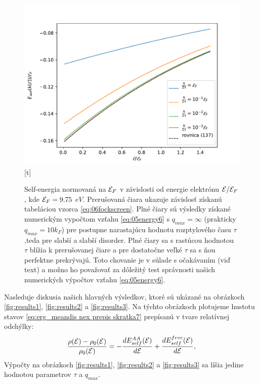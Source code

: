 \begin{figure}
\centering
\includegraphics[scale=1]{grafy/plot_se_test}[t]
\caption{Self-energia normovaná na $\mathcal{E}_F$ v závislosti od energie elektrónu $\mathcal{E}/\mathcal{E}_F$, kde $\mathcal{E}_F=9.75$ $eV$. Prerušovaná čiara ukazuje závislosť získanú tabeláciou vzorca \eqref{eq:06fockscreen}. 
Plné čiary sú výsledky získané numerickým vypočtom vzťahu \eqref{eq:05energy6} s  $q_{max} = \infty$ (prakticky $q_{max} = 10 k_F$)  pre postupne narastajúcu
hodnotu rozptylového času $\tau$,teda pre slabší a slabší disorder. Plné čiary sa s rastúcou hodnotou $\tau$ blížia k prerušovanej čiare a pre dostatočne veľké $\tau$ sa s ňou perfektne prekrývajú. Toto 
chovanie je v súlade s očakávaním (viď text) a možno ho považovať za dôležitý test správnosti našich numerických výpočtov vzťahu \eqref{eq:05energy6}.}
\label{fig:plot_test}
\end{figure}

Nasleduje diskusia našich hlavných výsledkov, ktoré sú ukázané na obrázkoch \ref{fig:results1}, \ref{fig:results2} a \ref{fig:results3}.
Na týchto obrázkoch plotujeme hustotu stavov \eqref{eq:erg_meandis nex prepis skratka7} prepísanú v tvare relatívnej odchýlky:
\begin{equation}\label{eq:erg_hustota stavov relat}
\frac{\rho(\mathcal{E}) - \rho_0(\mathcal{E})}{\rho_0(\mathcal{E})} = - \frac{dE_{self}^{AA}(\mathcal{E})}{d\mathcal{E}} + \frac{dE_{self}^{free}(\mathcal{E})}{d\mathcal{E}} \text{,}
\end{equation}
Výpočty na obrázkoch \ref{fig:results1}, \ref{fig:results2} a \ref{fig:results3} sa líšia jedine hodnotou parametrov $\tau$ a $q_{max}$.

